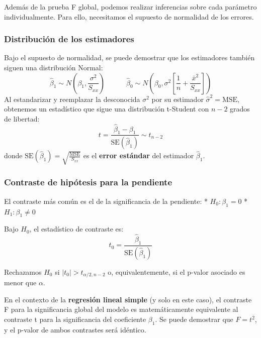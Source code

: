 \documentclass[
  letterpaper,
  DIV=11,
  numbers=noendperiod]{scrreprt}
\begin{document}
Además de la prueba F global, podemos realizar inferencias sobre cada
parámetro individualmente. Para ello, necesitamos el supuesto de
normalidad de los errores.

\subsubsection{Distribución de los
estimadores}\label{distribuciuxf3n-de-los-estimadores}

Bajo el supuesto de normalidad, se puede demostrar que los estimadores
también siguen una distribución Normal: \[
\hat{\beta}_1 \sim N\left(\beta_1, \frac{\sigma^2}{S_{xx}}\right) \quad \quad \quad \hat{\beta}_0 \sim N\left(\beta_0, \sigma^2 \left[ \frac{1}{n} + \frac{\bar{x}^2}{S_{xx}} \right]\right)
\] Al estandarizar y reemplazar la desconocida \(\sigma^2\) por su
estimador \(\hat{\sigma}^2 = \text{MSE}\), obtenemos un estadístico que
sigue una distribución t-Student con \(n-2\) grados de libertad: \[
t = \frac{\hat{\beta}_1 - \beta_1}{\text{SE}(\hat{\beta}_1)} \sim t_{n-2}\]
donde \(\text{SE}(\hat{\beta}_1) = \sqrt{\frac{\text{MSE}}{S_{xx}}}\) es
el \textbf{error estándar} del estimador \(\hat{\beta}_1\).

\subsubsection{Contraste de hipótesis para la
pendiente}\label{contraste-de-hipuxf3tesis-para-la-pendiente}

El contraste más común es el de la significancia de la pendiente: *
\(H_0: \beta_1 = 0\) * \(H_1: \beta_1 \neq 0\)

Bajo \(H_0\), el estadístico de contraste es: \[
t_0 = \frac{\hat{\beta}_1}{\text{SE}(\hat{\beta}_1)}\]

Rechazamos \(H_0\) si \(|t_0| > t_{\alpha/2, n-2}\) o, equivalentemente,
si el p-valor asociado es menor que \(\alpha\).

\begin{tcolorbox}[enhanced jigsaw, breakable, toprule=.15mm, bottomtitle=1mm, coltitle=black, colbacktitle=quarto-callout-note-color!10!white, titlerule=0mm, opacitybacktitle=0.6, bottomrule=.15mm, toptitle=1mm, title=\textcolor{quarto-callout-note-color}{\faInfo}\hspace{0.5em}{Relación entre el contraste F y el contraste t}, arc=.35mm, rightrule=.15mm, opacityback=0, colframe=quarto-callout-note-color-frame, leftrule=.75mm, left=2mm, colback=white]

En el contexto de la \textbf{regresión lineal simple} (y solo en este
caso), el contraste F para la significancia global del modelo es
matemáticamente equivalente al contraste t para la significancia del
coeficiente \(\beta_1\). Se puede demostrar que \(F = t^2\), y el
p-valor de ambos contrastes será idéntico.

\end{tcolorbox}
\end{document}

